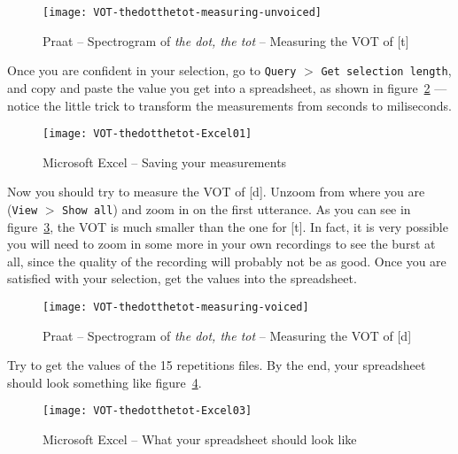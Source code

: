 \documentclass{article}
\newcommand{\soft}[1]{\textsf{#1}}
\newcommand{\softmenu}[1]{\texttt{#1}}
\newcommand{\MSExcel}{\soft{Microsoft\texttrademark{} Excel}}
\newcommand{\Praat}{\soft{Praat}}
\begin{document}
\begin{figure}[!tbp]
\caption{\Praat{} -- Spectrogram of \emph{the dot, the tot} -- Measuring the VOT of [t]}
\label{step3VOT}
	\begin{center}
		\texttt{[image: VOT-thedotthetot-measuring-unvoiced]}
	\end{center}
\end{figure}

Once you are confident in your selection, go to \softmenu{Query} $>$ \softmenu{Get selection length}, and copy and paste the value you get into a spreadsheet, as shown in figure~\ref{step4VOT} --- notice the little trick to transform the measurements from seconds to miliseconds.

\begin{figure}[!tbp]
\caption{\MSExcel{} -- Saving your measurements}
\label{step4VOT}
	\begin{center}
		\texttt{[image: VOT-thedotthetot-Excel01]}
	\end{center}
\end{figure}

Now you should try to measure the VOT of [d]. Unzoom from where you are (\softmenu{View} $>$ \softmenu{Show all}) and zoom in on the first utterance. As you can see in figure~\ref{step5VOT}, the VOT is much smaller than the one for [t]. In fact, it is very possible you will need to zoom in some more in your own recordings to see the burst at all, since the quality of the recording will probably not be as good. Once you are satisfied with your selection, get the values into the spreadsheet.

\begin{figure}[!tbp]
\caption{\Praat{} -- Spectrogram of \emph{the dot, the tot} -- Measuring the VOT of [d]}
\label{step5VOT}
	\begin{center}
		\texttt{[image: VOT-thedotthetot-measuring-voiced]}
	\end{center}
\end{figure}
 
Try to get the values of the 15 repetitions files. By the end, your spreadsheet should look something like figure~\ref{step6VOT}.

\begin{figure}[!tbp]
\caption{\MSExcel{} -- What your spreadsheet should look like}
\label{step6VOT}
	\begin{center}
		\texttt{[image: VOT-thedotthetot-Excel03]}
	\end{center}
\end{figure}
\end{document}
